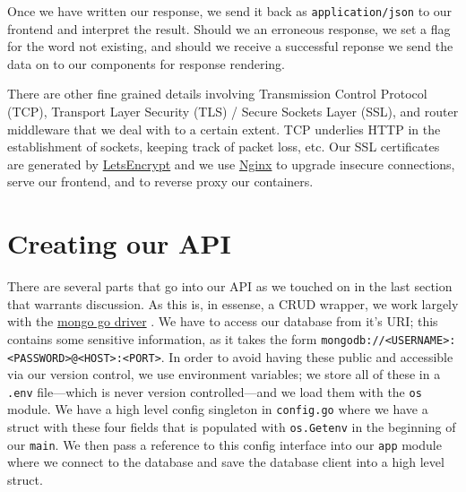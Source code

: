 \documentclass[11pt, twoside, reqno]{book}
\begin{document}
Once we have written our response, we send it back as \texttt{application/json} to our frontend and interpret the result. Should we an erroneous response, we set a flag for the word not existing, and should we receive a successful reponse we send the data on to our components for response rendering.

There are other fine grained details involving Transmission Control Protocol (TCP), Transport Layer Security (TLS) / Secure Sockets Layer (SSL), and router middleware that we deal with to a certain extent. TCP underlies HTTP in the establishment of sockets, keeping track of packet loss, etc. Our SSL certificates are generated by \href{https://letsencrypt.org/}{LetsEncrypt} and we use \href{https://www.nginx.com}{Nginx} to upgrade insecure connections, serve our frontend, and to reverse proxy our containers.


\section{Creating our API}

There are several parts that go into our API as we touched on in the last section that warrants discussion. As this is, in essense, a CRUD wrapper, we work largely with the \href{https://godoc.org/go.mongodb.org/mongo-driver/mongo}{mongo go driver} \cite{mongoGoD17:online}. We have to access our database from it's URI; this contains some sensitive information, as it takes the form \texttt{mongodb://<USERNAME>:<PASSWORD>@<HOST>:<PORT>}. In order to avoid having these public and accessible via our version control, we use environment variables; we store all of these in a \texttt{.env} file—which is never version controlled—and we load them with the \texttt{os} module. We have a high level config singleton in \texttt{config.go} where we have a struct with these four fields that is populated with \texttt{os.Getenv} in the beginning of our \texttt{main}. We then pass a reference to this config interface into our \texttt{app} module where we connect to the database and save the database client into a high level struct.
\end{document}
